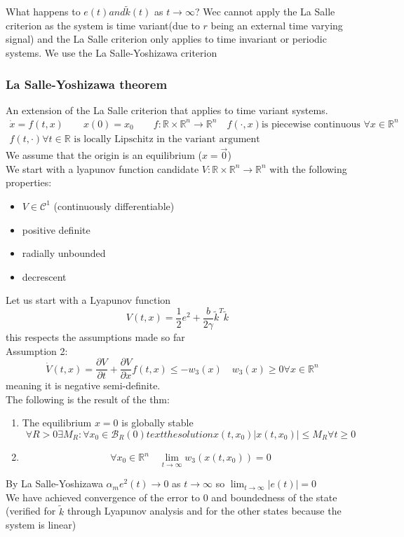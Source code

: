 \documentclass{book}
\begin{document}
What happens to $e(t) and \tilde{k}(t)$ as $t\to\infty$? Wec cannot apply the La Salle criterion as the system is time variant(due to $r$ being an external time varying signal) and the La Salle criterion only applies to time invariant or periodic systems. We use the La Salle-Yoshizawa criterion 
\subsubsection{La Salle-Yoshizawa theorem}
An extension of the La Salle criterion that applies to time variant systems. \\
\begin{gather*}
    \dot{x}=f(t,x) \qquad x(0)=x_0 \qquad f:\mathbb{R}\times \mathbb{R}^n \to\mathbb{R}^n \quad f(\cdot,x) \text{is piecewise continuous } \forall x \in \mathbb{R}^n \\
    f(t,\cdot) \forall t \in \mathbb{R} \text{ is locally Lipschitz in the variant argument}
\end{gather*}
We assume that the origin is an equilibrium ($x=\vec{0}$)\\
We start with a lyapunov function candidate $V:\mathbb{R}\times\mathbb{R}^n\to \mathbb{R}^n$ with the following properties: 
\begin{itemize}
    \item $V\in\mathcal{C}^1$ (continuously differentiable)
    \item positive definite 
    \item radially unbounded 
    \item decrescent
\end{itemize}
Let us start with a Lyapunov function 
\[
    V(t,x)=\displaystyle\frac{1}{2}e^2+\displaystyle\frac{b}{2\gamma}\tilde{k}^T\tilde{k} \quad
\]
this respects the assumptions made so far 
\\Assumption 2: 
\[
    \dot{V}(t,x)=\displaystyle\frac{\partial V}{\partial t}+\displaystyle\frac{\partial V }{\partial x}f(t,x) \leq -w_3(x) \quad w_3(x)\geq 0 \forall x\in\mathbb{R}^n
\]
meaning it is negative semi-definite.\\
The following is the result of the thm: 
\begin{enumerate}
    \item The equilibrium $x=0$ is globally stable 
        \[
            \forall R>0 \exists M_R:\forall x_0\in \mathcal{B}_R(0) text{the solution } x(t,x_0) |x(t,x_0)|\leq M_R \forall t \geq0
        \]
        \item \[
                \forall x_0\in\mathbb{R}^n \quad \lim_{t\to\infty}w_3(x(t,x_0))=0
        \]
\end{enumerate}
By La Salle-Yoshizawa $\alpha_me^2(t)\to 0 $ as $t\to\infty$ so $\lim_{t\to\infty}|e(t)|=0$
\\We have achieved convergence of the error to 0 and boundedness of the state (verified for $\tilde{k}$ through Lyapunov analysis and for the other states because the system is linear)
\end{document}
